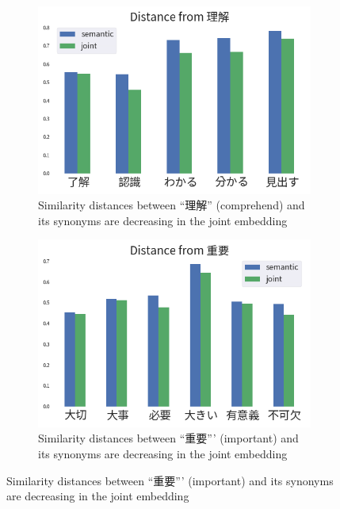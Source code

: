 \vspace{0.4cm}
\begin{CJK}{UTF8}{long}
    \begin{figure}[h]
        \centering
        \begin{subfigure}[b]{0.49\textwidth}
            \centering
            \includegraphics[width=\textwidth]{../images/similarity_ja1.png}
            \caption{Similarity distances between ``理解'' (comprehend) and its synonyms are decreasing in the joint embedding}
            \label{fig:similarity_ja1}
        \end{subfigure}
        \hfill
        \begin{subfigure}[b]{0.49\textwidth}
            \centering
            \includegraphics[width=\textwidth]{../images/similarity_ja2.png}
            \caption{Similarity distances between ``重要''' (important) and its synonyms are decreasing in the joint embedding}

\end{subfigure}
\end{figure}
\end{CJK}
